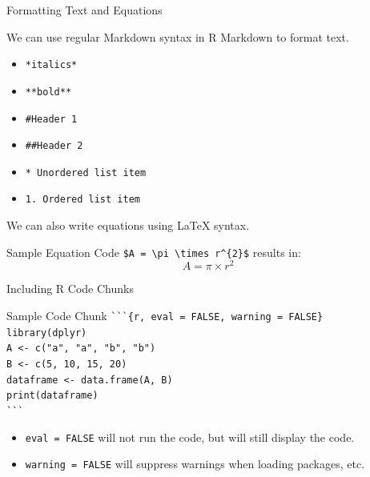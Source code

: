 \documentclass[9pt,handout]{beamer}
\newcommand{\skipv}{\vspace{8pt}}
\begin{document}
\begin{frame}{Formatting Text and Equations}

    We can use regular Markdown syntax in R Markdown to format text.
    \begin{itemize}
        \item   \texttt{*italics*}
        \item   \texttt{**bold**} 
        \item   \texttt{\#Header 1}
        \item   \texttt{\#\#Header 2}
        \item   \texttt{* Unordered list item} 
        \item   \texttt{1. Ordered list item}
    \end{itemize}
    \skipv
    We can also write equations using LaTeX syntax.
    \begin{block}{Sample Equation}
        Code \quad \texttt{\$A = \textbackslash pi \textbackslash times r\^ \quad \{2\}\$} results in:
        $$A = \pi \times r^{2}$$
    \end{block}

\end{frame}


\begin{frame}[fragile]{Including R Code Chunks}
    
    \begin{block}{Sample Code Chunk}
    \quad    \Verb|```{r, eval = FALSE, warning = FALSE}| \\
    \quad    \Verb|library(dplyr)| \\
    \quad    \Verb|A <- c("a", "a", "b", "b")| \\
    \quad    \Verb|B <- c(5, 10, 15, 20)| \\
    \quad    \Verb|dataframe <- data.frame(A, B)| \\
    \quad   \Verb|print(dataframe)| \\
    \quad    \Verb|```|
    \end{block}

    \skipv

    \begin{itemize}
        \item   \texttt{eval = FALSE} will not run the code, but will still display the code. 
        \item   \texttt{warning = FALSE} will suppress warnings when loading packages, etc. 
    \end{itemize}

\end{frame}
\end{document}
